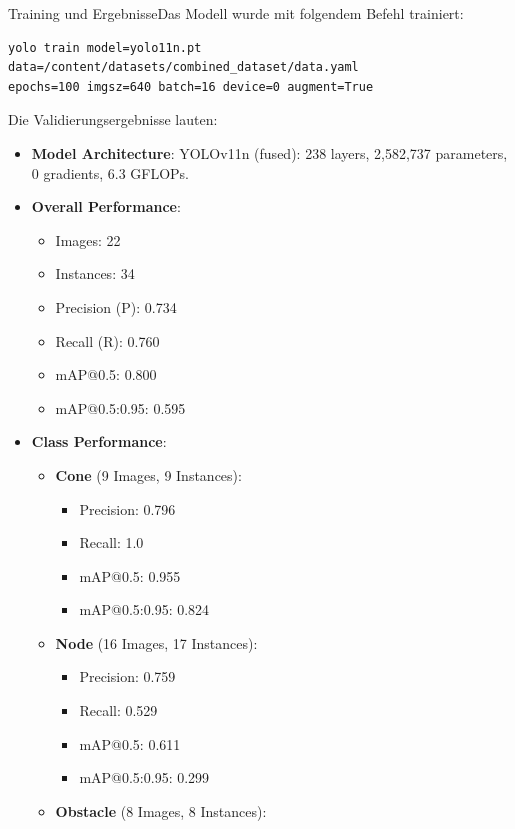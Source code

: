 Training und ErgebnisseDas Modell wurde mit folgendem Befehl trainiert:


\begin{verbatim}
yolo train model=yolo11n.pt data=/content/datasets/combined_dataset/data.yaml 
epochs=100 imgsz=640 batch=16 device=0 augment=True
\end{verbatim}

Die Validierungsergebnisse lauten:

\begin{itemize}
    \item \textbf{Model Architecture}: YOLOv11n (fused): 238 layers, 2,582,737 parameters, 0 gradients, 6.3 GFLOPs.
    \item \textbf{Overall Performance}:
    \begin{itemize}
        \item Images: 22
        \item Instances: 34
        \item Precision (P): 0.734
        \item Recall (R): 0.760
        \item mAP@0.5: 0.800
        \item mAP@0.5:0.95: 0.595
    \end{itemize}
    \item \textbf{Class Performance}:
    \begin{itemize}
        \item \textbf{Cone} (9 Images, 9 Instances):
        \begin{itemize}
            \item Precision: 0.796
            \item Recall: 1.0
            \item mAP@0.5: 0.955
            \item mAP@0.5:0.95: 0.824
        \end{itemize}
        \item \textbf{Node} (16 Images, 17 Instances):
        \begin{itemize}
            \item Precision: 0.759
            \item Recall: 0.529
            \item mAP@0.5: 0.611
            \item mAP@0.5:0.95: 0.299
        \end{itemize}
        \item \textbf{Obstacle} (8 Images, 8 Instances):
        \begin{itemize}

\end{itemize}
\end{itemize}
\end{itemize}
